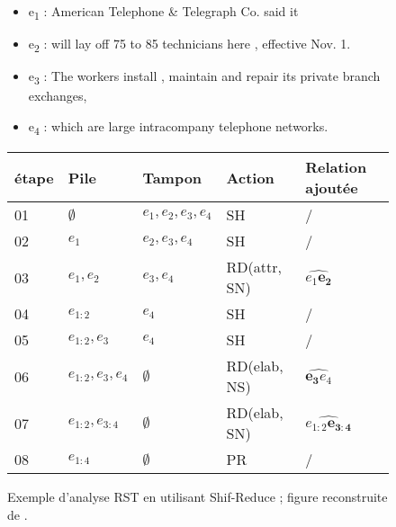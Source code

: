 \documentclass{KodeBook}
\begin{document}
%	

\begin{figure}[!ht]
	\centering
	\begin{minipage}{0.25\textwidth}
	\end{minipage}
	\begin{minipage}{0.70\textwidth}
		\small
		\begin{itemize}
			\item e\textsubscript{1} : American Telephone \& Telegraph Co. said it
			\item e\textsubscript{2} : will lay off 75 to 85 technicians here , effective Nov. 1.
			\item e\textsubscript{3} : The workers install , maintain and repair its private branch exchanges,
			\item e\textsubscript{4} : which are large intracompany telephone networks.
		\end{itemize}
	\end{minipage}
	
	\begin{tabular}{lllll}
		\hline\hline 
		étape & Pile & Tampon & Action & Relation ajoutée \\
		\hline
		01 & $\emptyset$ & $e_1, e_2, e_3, e_4$ & SH & / \\
		02 & $e_1$ & $e_2, e_3, e_4$ & SH & / \\
		03 & $e_1, e_2$ & $e_3, e_4$ & RD(attr, SN) & $\widehat{e_1 \mathbf{e_2}}$ \\
		04 & $e_{1:2}$ & $e_4$ & SH & / \\
		05 & $e_{1:2}, e_3$ & $e_4$ & SH & / \\
		06 & $e_{1:2}, e_3, e_4$ & $\emptyset$ & RD(elab, NS) & $\widehat{\mathbf{e_3} e_4}$ \\
		07 & $e_{1:2}, e_{3:4}$ & $\emptyset$ & RD(elab, SN) & $\widehat{e_{1:2}\mathbf{e_{3:4}}}$ \\
		08 & $e_{1:4}$ & $\emptyset$ & PR & / \\
		\hline\hline
	\end{tabular}
	
	\caption[Exemple d'analyse RST en utilisant Shif-Reduce]{Exemple d'analyse RST en utilisant Shif-Reduce ; figure reconstruite de \cite{2018-yu-al}.}
	\label{fig:rst-shred-yu-al}
\end{figure}
\end{document}
